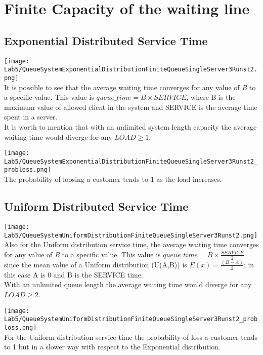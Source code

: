 \documentclass[twocolumn,letterpaper]{report}
\begin{document}
{						
						
	\section{Finite Capacity of the waiting line}
	 			\subsection{Exponential Distributed Service Time}
	 						\texttt{[image: Lab5/QueueSystemExponentialDistributionFiniteQueueSingleServer3Runst2.png]} \\
It is possible to see that the average waiting time converges for any value of \emph{B} to a specific value. This value is $queue\_time = B \times SERVICE$, where B is the maximum value of allowed client in the system and SERVICE is the average time spent in a server. \\
It is worth to mention that with an unlimited system length capacity the average waiting time would diverge for any $LOAD \ge 1$.

	 					\texttt{[image: Lab5/QueueSystemExponentialDistributionFiniteQueueSingleServer3Runst2\_probloss.png]} \\
	 					The probability of loosing a customer tends to 1 as the load increases.
	 					
	 			\subsection{Uniform Distributed Service Time}
	 			\texttt{[image: Lab5/QueueSystemUniformDistributionFiniteQueueSingleServer3Runst2.png]} \\
	 			Also for the Uniform distribution service time, the average waiting time converges for any value of \emph{B} to a specific value. This value is $queue\_time = B \times\frac{SERVICE}{2}$ since the mean value of a Uniform distribution (U(A,B)) is $E(x)=\frac{(B-A)}{2}$; in this case A is 0 and B is the SERVICE time. \\
	 			With an unlimited queue length the average waiting time would diverge for any $LOAD \ge 2$.
	 			
	 		\texttt{[image: Lab5/QueueSystemUniformDistributionFiniteQueueSingleServer3Runst2\_probloss.png]} \\
	 			For the Uniform distribution service time the probability of loss a customer tends to 1 but in a slower way with respect to the Exponential distribution.
	 			
}
\end{document}
